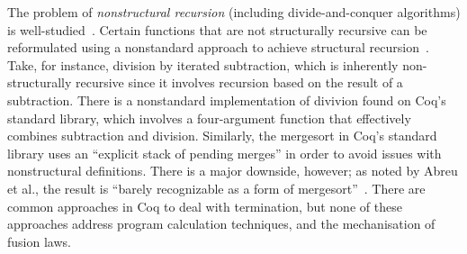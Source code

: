 \documentclass[a4paper,anonymous, UKenglish,cleveref, autoref, thm-restate]{lipics-v2021}
\newcommand{\haskell}[1]{\texttt{#1}}
\begin{document}
The problem of \emph{nonstructural recursion} (including
divide-and-conquer algorithms) is well-studied~\cite{BoveKS16}.
Certain functions that are not structurally recursive can be reformulated using
a nonstandard approach to achieve structural recursion~\cite{AbreuDHJMS23}.
Take, for instance, division by iterated subtraction, which is inherently
non-structurally recursive since it involves recursion based on the result of a
subtraction. There is a nonstandard implementation of divivion found on Coq's
standard library, which involves a four-argument function that effectively
combines subtraction and division. Similarly, the mergesort in Coq's standard
library uses an ``explicit stack of pending merges'' in order to avoid issues
with nonstructural definitions. There is a major downside, however; as noted by
Abreu et al., the result is ``barely recognizable as a form of
mergesort''~\cite{AbreuDHJMS23}.
There are common approaches in Coq to deal with termination, but none of these
approaches address program calculation techniques, and the mechanisation of
fusion laws.



\end{document}
